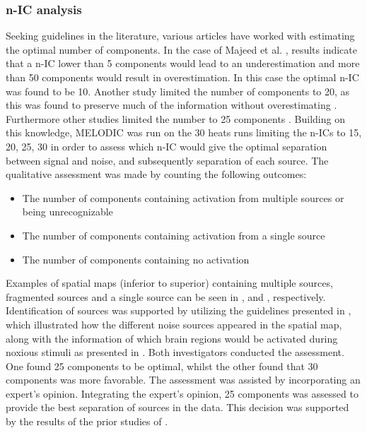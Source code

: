 \subsubsection{n-IC analysis}

Seeking guidelines in the literature, various articles have worked with estimating the optimal number of components. In the case of Majeed et al. \cite{Majeed2014}, results indicate that a n-IC lower than 5 components would lead to an underestimation and more than 50 components would result in overestimation. In this case the optimal n-IC was found to be 10. Another study limited the number of components to 20, as this was found to preserve much of the information without overestimating \cite{Calhoun2001}. Furthermore other studies limited the number to 25 components \cite{Kim2013,Erpelding2013}. Building on this knowledge, MELODIC was run on the 30 heats runs limiting the n-ICs to 15, 20, 25, 30 in order to assess which n-IC would give the optimal separation between signal and noise, and subsequently separation of each source. The qualitative assessment was made by counting the following outcomes: 
\begin{itemize}
	\item The number of components containing activation from multiple sources or being unrecognizable 
	\item The number of components containing activation from a single source 
	\item The number of components containing no activation    
\end{itemize}
 
Examples of spatial maps (inferior to superior) containing multiple sources, fragmented sources and a single source can be seen in ,  and , respectively. Identification of sources was supported by utilizing the guidelines presented in \cite{Griffanti2017}, which illustrated how the different noise sources appeared in the spatial map, along with the information of which brain regions would be activated during noxious stimuli as presented in . Both investigators conducted the assessment. One found 25 components to be optimal, whilst the other found that 30 components was more favorable. The assessment was assisted by incorporating an expert's opinion. Integrating the expert's opinion, 25 components was assessed to provide the best separation of sources in the data. This decision was supported by the results of the prior studies of \cite{Kim2013,Erpelding2013}.     

